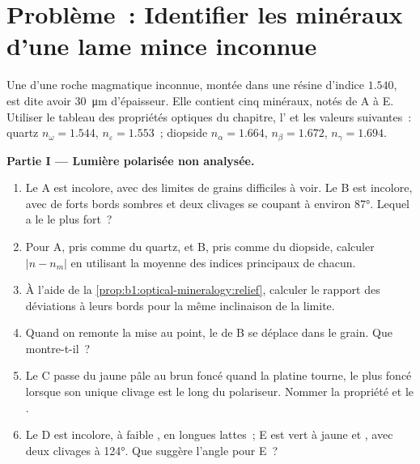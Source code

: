 \section{Problème~: Identifier les minéraux d'une lame mince inconnue}

\begin{problem}
\label{pb:b1:optical-mineralogy:1}
Une  d'une roche magmatique inconnue, montée dans une résine d'indice
$1.540$, est dite avoir \qty{30}{\micro m} d'épaisseur. Elle contient cinq
minéraux, notés de A à E. Utiliser le tableau des propriétés optiques du
chapitre, l' et les valeurs suivantes~: quartz
$n_\omega = 1.544$, $n_\varepsilon = 1.553$~; diopside $n_\alpha = 1.664$,
$n_\beta = 1.672$, $n_\gamma = 1.694$.

\medskip
\noindent\textbf{Partie I --- Lumière polarisée non analysée.}
\begin{enumerate}
  \item Le  A est incolore, avec des limites de grains difficiles à voir.
        Le  B est incolore, avec de forts bords sombres et deux clivages
        se coupant à environ \ang{87}. Lequel a le  le plus fort~?
  \item Pour A, pris comme du quartz, et B, pris comme du diopside, calculer
        $|n - n_m|$ en utilisant la moyenne des indices principaux de chacun.
  \item À l'aide de la \cref{prop:b1:optical-mineralogy:relief}, calculer le
        rapport des déviations à leurs bords pour la même inclinaison de la
        limite.
  \item Quand on remonte la mise au point, le  de B se déplace
        dans le grain. Que montre-t-il~?
  \item Le  C passe du jaune pâle au brun foncé quand la platine tourne,
        le plus foncé lorsque son unique clivage est le long du polariseur.
        Nommer la propriété et le .
  \item Le  D est incolore, à faible , en longues lattes~; E est vert
        à jaune et , avec deux clivages à \ang{124}. Que suggère
        l'angle pour E~?
\end{enumerate}


\end{problem}

